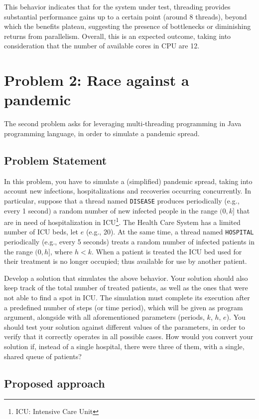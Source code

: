 \documentclass[acmlarge]{acmart}
\newcommand{\disease}{{\small \texttt{DISEASE}} }
\newcommand{\hospital}{{\small \texttt{HOSPITAL}} }
\begin{document}
This behavior indicates that for the system under test, threading provides substantial performance gains up to a
certain point (around 8 threads), beyond which the benefits plateau, suggesting the presence of bottlenecks or diminishing returns from parallelism.
Overall, this is an expected outcome, taking into consideration that the number of available cores in CPU are 12.


\section{Problem 2: Race against a pandemic}
\label{section:problem2}
The second problem asks for leveraging multi-threading programming in Java programming language, in order to simulate a pandemic spread.
\subsection{Problem Statement}
In this problem, you have to simulate a (simplified) pandemic spread, taking into account new infections, hospitalizations and recoveries occurring concurrently. In particular, suppose that a thread named \disease produces periodically (e.g., every 1 second) a random number of new infected people in the range $(0, k]$ that are in need of hospitalization in ICU\footnote{ICU: Intensive Care Unit}. The Health Care System has a limited number of ICU beds, let $e$ (e.g., 20). At the same time, a thread named \hospital periodically (e.g., every 5 seconds) treats a random number of infected patients in the range $(0, h]$, where $h<k$. When a patient is treated the ICU bed used for their treatment is no longer occupied; thus available for use by another patient.

Develop a solution that simulates the above behavior. Your solution should also keep track of the total number of treated patients, as well as the ones that were not able to find a spot in ICU. The simulation must complete its execution after a predefined number of steps (or time period), which will be given as program argument, alongside with all aforementioned parameters (periods, $k$, $h$, $e$). You should test your solution against different values of the parameters, in order to verify that it correctly operates in all possible cases. How would you convert your solution if, instead of a single hospital, there were three of them, with a single, shared queue of patients?

\subsection{Proposed approach}
\end{document}
